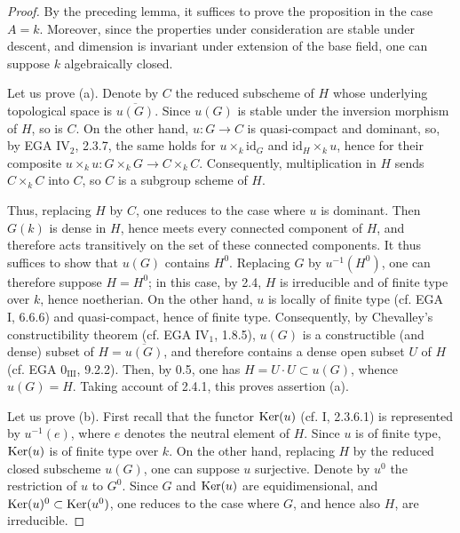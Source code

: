 \begin{proof}
By the preceding lemma, it suffices to prove the proposition in the case $A=k$. Moreover, since the properties under consideration are stable under \fpqc descent, and dimension is invariant under extension of the base field, one can suppose $k$ algebraically closed.

Let us prove (a). Denote by $C$ the reduced subscheme of $H$ whose underlying topological space is $\overline{u(G)}$. Since $u(G)$ is stable under the inversion morphism of $H$, so is $C$. On the other hand, $u:G\to C$ is quasi-compact and dominant, so, by EGA IV$_2$, 2.3.7, the same holds for $u\times_k\mathrm{id}_G$ and $\mathrm{id}_H\times_ku$, hence for their composite $u\times_ku:G\times_kG\to C\times_kC$. Consequently, multiplication in $H$ sends $C\times_kC$ into $C$, so $C$ is a subgroup scheme of $H$.

Thus, replacing $H$ by $C$, one reduces to the case where $u$ is dominant. Then $G(k)$ is dense in $H$, hence meets every connected component of $H$, and therefore acts transitively on the set of these connected components. It thus suffices to show that $u(G)$ contains $H^0$. Replacing $G$ by $u^{-1}(H^0)$, one can therefore suppose $H=H^0$; in this case, by 2.4, $H$ is irreducible and of finite type over $k$, hence noetherian. On the other hand, $u$ is locally of finite type (cf. EGA I, 6.6.6) and quasi-compact, hence of finite type. Consequently, by Chevalley's constructibility theorem (cf. EGA IV$_1$, 1.8.5), $u(G)$ is a constructible (and dense) subset of $H=\overline{u(G)}$, and therefore contains a dense open subset $U$ of $H$ (cf. EGA $0_{\mathrm{III}}$, 9.2.2). Then, by 0.5, one has $H=U\cdot U\subset u(G)$, whence $u(G)=H$. Taking account of 2.4.1, this proves assertion (a).

Let us prove (b). First recall that the functor $\operatorname{Ker}(u)$ (cf. I, 2.3.6.1) is represented by $u^{-1}(e)$, where $e$ denotes the neutral element of $H$. Since $u$ is of finite type, $\operatorname{Ker}(u)$ is of finite type over $k$. On the other hand, replacing $H$ by the reduced closed subscheme $u(G)$, one can suppose $u$ surjective. Denote by $u^0$ the restriction of $u$ to $G^0$. Since $G$ and $\operatorname{Ker}(u)$ are equidimensional, and $\operatorname{Ker}(u)^0\subset\operatorname{Ker}(u^0)$, one reduces to the case where $G$, and hence also $H$, are irreducible.


\end{proof}
